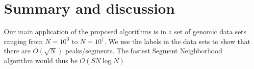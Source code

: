 \documentclass[article]{jss}
\begin{document}











\section{Summary and discussion} \label{sec:summary} Our main
application of the proposed algorithms is in a set of genomic data
sets ranging from $N=10^3$ to $N=10^7$. We use the labels in the data
sets to show that there are $O(\sqrt N)$ peaks/segments. The fastest
Segment Neighborhood algorithm would thus be $O(SN\log N)$
\end{document}
